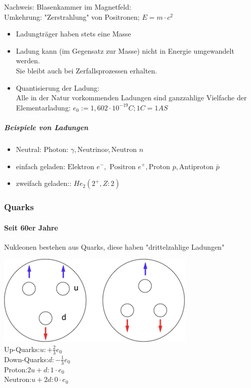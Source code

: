 \documentclass[11pt]{article}
\begin{document}
				\newpage
				
				\noindent Nachweis: Blasenkammer im Magnetfeld:  \hfill \\
				Umkehrung: "Zerstrahlung" von Positronen; $E=m\cdot c^2$
				\begin{itemize}
					\item Ladungtr\"{a}ger haben stets eine Masse
					\item Ladung kann (im Gegensatz zur Masse) nicht in Energie umgewandelt werden. \\
					      Sie bleibt auch bei Zerfallsprozessen erhalten.
					\item Quantisierung der Ladung:\\
						Alle in der Natur vorkommenden Ladungen sind ganzzahlige Vielfache der Elementarladung: $e_0:=1,602\cdot10^{-19}C; 1C=1AS$
				\end{itemize}
				\subparagraph{Beispiele von Ladungen}
				\begin{itemize}
					\item Neutral: $\text{Photon: }\gamma, \text{Neutrino}\nu, \text{Neutron }n$
					\item einfach geladen: $\text{Elektron }e^-,\text{ Positron } e^+, \text{Proton }p, \text{Antiproton }\bar{p}$
					\item zweifach geladen:: $He_2(2^+,Z:2)$
				\end{itemize}	
				

\subsubsection{ Quarks }	
\paragraph{Seit 60er Jahre}
Nukleonen bestehen aus Quarks, diese haben "drittelzahlige Ladungen"

\includegraphics{skizzen/14/14_1B5}
\\
Up-Quarks:$u:+\frac{2}{3	}e_0$
\\
Down-Quarks:$d:-\frac{1}{3}e_0$
\\
Proton:$2u+d: 1\cdot e_0$
\\
Neutron:$u+2d: 0\cdot e_0$
\\
\end{document}
